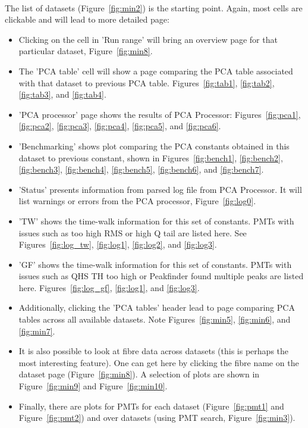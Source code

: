 \documentclass[12pt]{article}
\begin{document}
\paragraph{}
The list of datasets (Figure~\ref{fig:min2}) is the starting point. Again, most cells are clickable and will lead to more detailed page:
\begin{itemize}
	\item Clicking on the cell in 'Run range' will bring an overview page for that particular dataset, Figure~\ref{fig:min8}.
	\item The 'PCA table' cell will show a page comparing the PCA table associated with that dataset to previous PCA table. Figures~\ref{fig:tab1}, \ref{fig:tab2}, \ref{fig:tab3}, and \ref{fig:tab4}.
	\item 'PCA processor' page shows the results of PCA Processor: Figures~\ref{fig:pca1}, \ref{fig:pca2}, \ref{fig:pca3}, \ref{fig:pca4}, \ref{fig:pca5}, and \ref{fig:pca6}.
	\item 'Benchmarking' shows plot comparing the PCA constants obtained in this dataset to previous constant, shown in Figures~\ref{fig:bench1}, \ref{fig:bench2}, \ref{fig:bench3}, \ref{fig:bench4}, \ref{fig:bench5}, \ref{fig:bench6}, and \ref{fig:bench7}.
	\item 'Status' presents information from parsed log file from PCA Processor. It will list warnings or errors from the PCA processor, Figure~\ref{fig:log0}.
	\item 'TW' shows the time-walk information for this set of constants. PMTs with issues such as too high RMS or high Q tail are listed here. See Figures~\ref{fig:log_tw}, \ref{fig:log1}, \ref{fig:log2}, and \ref{fig:log3}.
	\item 'GF' shows the time-walk information for this set of constants. PMTs with issues such as QHS TH too high or Peakfinder found multiple peaks are listed here. Figures~\ref{fig:log_gf}, \ref{fig:log1}, and \ref{fig:log3}.
	\item Additionally, clicking the 'PCA tables' header lead to page comparing PCA tables across all available datasets. Note Figures~\ref{fig:min5}, \ref{fig:min6}, and \ref{fig:min7}.
	\item It is also possible to look at fibre data across datasets (this is perhaps the most interesting feature). One can get here by clicking the fibre name on the dataset page (Figure~\ref{fig:min8}). A selection of plots are shown in Figure~\ref{fig:min9} and Figure~\ref{fig:min10}.
	\item Finally, there are plots for PMTs for each dataset (Figure~\ref{fig:pmt1} and Figure~\ref{fig:pmt2}) and over datasets (using PMT search, Figure~\ref{fig:min3}).
\end{itemize}
\end{document}
